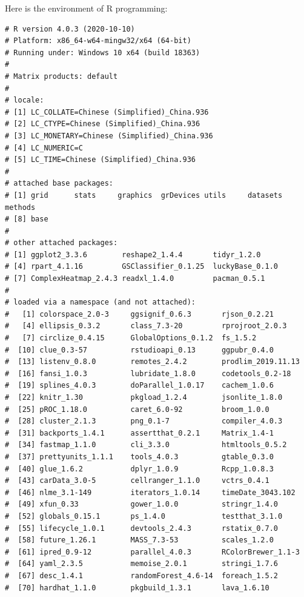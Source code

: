 \documentclass[
  12pt,
]{book}
\begin{document}
Here is the environment of R programming:

\begin{lstlisting}
# R version 4.0.3 (2020-10-10)
# Platform: x86_64-w64-mingw32/x64 (64-bit)
# Running under: Windows 10 x64 (build 18363)
# 
# Matrix products: default
# 
# locale:
# [1] LC_COLLATE=Chinese (Simplified)_China.936 
# [2] LC_CTYPE=Chinese (Simplified)_China.936   
# [3] LC_MONETARY=Chinese (Simplified)_China.936
# [4] LC_NUMERIC=C                              
# [5] LC_TIME=Chinese (Simplified)_China.936    
# 
# attached base packages:
# [1] grid      stats     graphics  grDevices utils     datasets  methods  
# [8] base     
# 
# other attached packages:
# [1] ggplot2_3.3.6        reshape2_1.4.4       tidyr_1.2.0         
# [4] rpart_4.1.16         GSClassifier_0.1.25  luckyBase_0.1.0     
# [7] ComplexHeatmap_2.4.3 readxl_1.4.0         pacman_0.5.1        
# 
# loaded via a namespace (and not attached):
#   [1] colorspace_2.0-3     ggsignif_0.6.3       rjson_0.2.21        
#   [4] ellipsis_0.3.2       class_7.3-20         rprojroot_2.0.3     
#   [7] circlize_0.4.15      GlobalOptions_0.1.2  fs_1.5.2            
#  [10] clue_0.3-57          rstudioapi_0.13      ggpubr_0.4.0        
#  [13] listenv_0.8.0        remotes_2.4.2        prodlim_2019.11.13  
#  [16] fansi_1.0.3          lubridate_1.8.0      codetools_0.2-18    
#  [19] splines_4.0.3        doParallel_1.0.17    cachem_1.0.6        
#  [22] knitr_1.30           pkgload_1.2.4        jsonlite_1.8.0      
#  [25] pROC_1.18.0          caret_6.0-92         broom_1.0.0         
#  [28] cluster_2.1.3        png_0.1-7            compiler_4.0.3      
#  [31] backports_1.4.1      assertthat_0.2.1     Matrix_1.4-1        
#  [34] fastmap_1.1.0        cli_3.3.0            htmltools_0.5.2     
#  [37] prettyunits_1.1.1    tools_4.0.3          gtable_0.3.0        
#  [40] glue_1.6.2           dplyr_1.0.9          Rcpp_1.0.8.3        
#  [43] carData_3.0-5        cellranger_1.1.0     vctrs_0.4.1         
#  [46] nlme_3.1-149         iterators_1.0.14     timeDate_3043.102   
#  [49] xfun_0.33            gower_1.0.0          stringr_1.4.0       
#  [52] globals_0.15.1       ps_1.4.0             testthat_3.1.0      
#  [55] lifecycle_1.0.1      devtools_2.4.3       rstatix_0.7.0       
#  [58] future_1.26.1        MASS_7.3-53          scales_1.2.0        
#  [61] ipred_0.9-12         parallel_4.0.3       RColorBrewer_1.1-3  
#  [64] yaml_2.3.5           memoise_2.0.1        stringi_1.7.6       
#  [67] desc_1.4.1           randomForest_4.6-14  foreach_1.5.2       
#  [70] hardhat_1.1.0        pkgbuild_1.3.1       lava_1.6.10         

\end{lstlisting}
\end{document}
